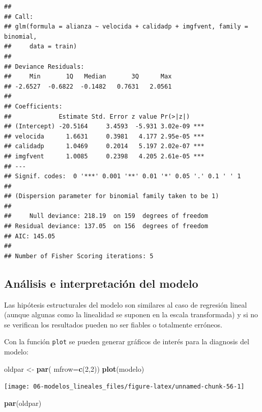 \documentclass[
  spanish,
]{book}
\newenvironment{Shaded}{\begin{snugshade}}{\end{snugshade}}
\newcommand{\DataTypeTok}[1]{\textcolor[rgb]{0.13,0.29,0.53}{#1}}
\newcommand{\DecValTok}[1]{\textcolor[rgb]{0.00,0.00,0.81}{#1}}
\newcommand{\KeywordTok}[1]{\textcolor[rgb]{0.13,0.29,0.53}{\textbf{#1}}}
\newcommand{\NormalTok}[1]{#1}
\newcommand{\StringTok}[1]{\textcolor[rgb]{0.31,0.60,0.02}{#1}}
\theoremstyle{break}
\theoremstyle{definition}
\theoremstyle{definition}
\theoremstyle{definition}
\theoremstyle{remark}
\begin{document}
\begin{verbatim}
## 
## Call:
## glm(formula = alianza ~ velocida + calidadp + imgfvent, family = binomial, 
##     data = train)
## 
## Deviance Residuals: 
##     Min       1Q   Median       3Q      Max  
## -2.6527  -0.6822  -0.1482   0.7631   2.0561  
## 
## Coefficients:
##             Estimate Std. Error z value Pr(>|z|)    
## (Intercept) -20.5164     3.4593  -5.931 3.02e-09 ***
## velocida      1.6631     0.3981   4.177 2.95e-05 ***
## calidadp      1.0469     0.2014   5.197 2.02e-07 ***
## imgfvent      1.0085     0.2398   4.205 2.61e-05 ***
## ---
## Signif. codes:  0 '***' 0.001 '**' 0.01 '*' 0.05 '.' 0.1 ' ' 1
## 
## (Dispersion parameter for binomial family taken to be 1)
## 
##     Null deviance: 218.19  on 159  degrees of freedom
## Residual deviance: 137.05  on 156  degrees of freedom
## AIC: 145.05
## 
## Number of Fisher Scoring iterations: 5
\end{verbatim}

\hypertarget{analisis-glm}{%
\subsection{Análisis e interpretación del modelo}\label{analisis-glm}}

Las hipótesis estructurales del modelo son similares al caso de regresión lineal (aunque algunas como la linealidad se suponen en la escala transformada) y si no se verifican los resultados pueden no ser fiables o totalmente erróneos.

Con la función \texttt{plot} se pueden generar gráficos de interés para la diagnosis del modelo:

\begin{Shaded}
\begin{Highlighting}[]
\NormalTok{oldpar <-}\StringTok{ }\KeywordTok{par}\NormalTok{( }\DataTypeTok{mfrow=}\KeywordTok{c}\NormalTok{(}\DecValTok{2}\NormalTok{,}\DecValTok{2}\NormalTok{))}
\KeywordTok{plot}\NormalTok{(modelo)}
\end{Highlighting}
\end{Shaded}

\begin{center}\texttt{[image: 06-modelos\_lineales\_files/figure-latex/unnamed-chunk-56-1]} \end{center}

\begin{Shaded}
\begin{Highlighting}[]
\KeywordTok{par}\NormalTok{(oldpar)}
\end{Highlighting}
\end{Shaded}
\end{document}
